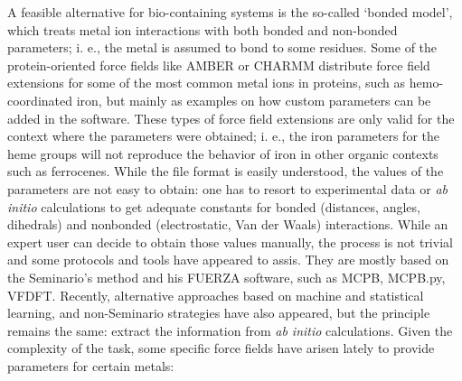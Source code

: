 A feasible alternative for bio-containing systems is the so-called ‘bonded model’, which treats metal ion interactions with both bonded and non-bonded parameters; i. e., the metal is assumed to bond to some residues. Some of the protein-oriented force fields like AMBER\cite{amber} or CHARMM\cite{brooks1983} distribute force field extensions for some of the most common metal ions in proteins, such as hemo-coordinated iron, but mainly as examples on how custom parameters can be added in the software. These types of force field extensions are only valid for the context where the parameters were obtained; i. e., the iron parameters for the heme groups will not reproduce the behavior of iron in other organic contexts such as ferrocenes. While the file format is easily understood, the values of the parameters are not easy to obtain: one has to resort to experimental data or \textit{ab initio} calculations to get adequate constants for bonded (distances, angles, dihedrals) and nonbonded (electrostatic, Van der Waals) interactions. While an expert user can decide to obtain those values manually, the process is not trivial and some protocols and tools have appeared to assis. They are mostly based on the Seminario’s method and his FUERZA software,\cite{Seminario1996} such as MCPB, MCPB.py,\cite{li2016} VFDFT.\cite{zheng2016} Recently, alternative approaches based on machine and statistical learning, \cite{fracchia2017,li2017b} and non-Seminario strategies\cite{Burger2012, allen2017} have also appeared, but the principle remains the same: extract the information from \textit{ab initio} calculations. Given the complexity of the task, some specific force fields have arisen lately to provide parameters for certain metals:

